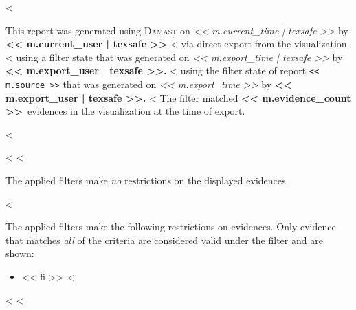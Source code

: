 <%

This report was generated using \textsc{Damast} on
\emph{<< m.current_time | texsafe >>}
by \textbf{<< m.current_user | texsafe >>}
  <%
  via direct export from the visualization.
  <%
  using a filter state that was generated on
  \emph{<< m.export_time | texsafe >>}
  by
  \textbf{<< m.export_user | texsafe >>.}
  <%
  using the filter state of report \texttt{<< m.source >>}
  that was generated on
  \emph{<< m.export_time >>}
  by
  \textbf{<< m.export_user | texsafe >>.}
  <%
  The filter matched
  \textbf{<< m.evidence_count >>}~evidences
  in the visualization at the time of export.

<%


<%
<%

The applied filters make \emph{no} restrictions on the displayed evidences.

<%

The applied filters make the following restrictions on evidences.
Only evidence that matches \emph{all} of the criteria are considered valid under the filter and are shown:

\begin{itemize}
  <%
  \item << fi >>
  <%
\end{itemize}
<%
<%

